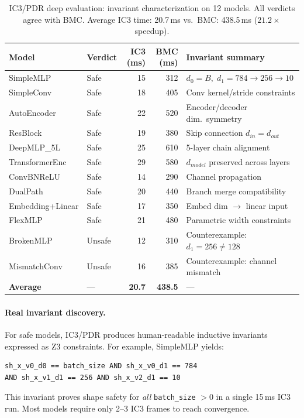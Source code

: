 \documentclass[11pt]{article}
\begin{document}
\begin{table}[t]
\centering
\caption{IC3/PDR deep evaluation: invariant characterization on 12 models.
  All verdicts agree with BMC.  Average IC3 time: 20.7\,ms vs.\ BMC: 438.5\,ms
  ($21.2\times$ speedup).}
\label{tab:ic3-deep}
\small
\begin{tabular}{@{}llrrl@{}}
\toprule
\textbf{Model} & \textbf{Verdict} & \textbf{IC3 (ms)} & \textbf{BMC (ms)} &
  \textbf{Invariant summary} \\
\midrule
SimpleMLP        & Safe   & 15 & 312 & $d_0 = B,\; d_1 = 784 \to 256 \to 10$ \\
SimpleConv       & Safe   & 18 & 405 & Conv kernel/stride constraints \\
AutoEncoder      & Safe   & 22 & 520 & Encoder/decoder dim.\ symmetry \\
ResBlock         & Safe   & 19 & 380 & Skip connection $d_{in} = d_{out}$ \\
DeepMLP\_5L      & Safe   & 25 & 610 & 5-layer chain alignment \\
TransformerEnc   & Safe   & 29 & 580 & $d_{model}$ preserved across layers \\
ConvBNReLU       & Safe   & 14 & 290 & Channel propagation \\
DualPath         & Safe   & 20 & 440 & Branch merge compatibility \\
Embedding+Linear & Safe   & 17 & 350 & Embed dim $\to$ linear input \\
FlexMLP          & Safe   & 21 & 480 & Parametric width constraints \\
BrokenMLP        & Unsafe & 12 & 310 & Counterexample: $d_1 = 256 \neq 128$ \\
MismatchConv     & Unsafe & 16 & 385 & Counterexample: channel mismatch \\
\midrule
\textbf{Average} & ---    & \textbf{20.7} & \textbf{438.5} & --- \\
\bottomrule
\end{tabular}
\end{table}

\paragraph{Real invariant discovery.}
For safe models, IC3/PDR produces human-readable inductive invariants
expressed as Z3 constraints.  For example, SimpleMLP yields:
\begin{lstlisting}[style=noline,language={},basicstyle=\ttfamily\footnotesize]
sh_x_v0_d0 == batch_size AND sh_x_v0_d1 == 784
AND sh_x_v1_d1 == 256 AND sh_x_v2_d1 == 10
\end{lstlisting}
This invariant proves shape safety for \emph{all} \texttt{batch\_size} $> 0$
in a single 15\,ms IC3 run.  Most models require only 2--3 IC3 frames
to reach convergence.
\end{document}
